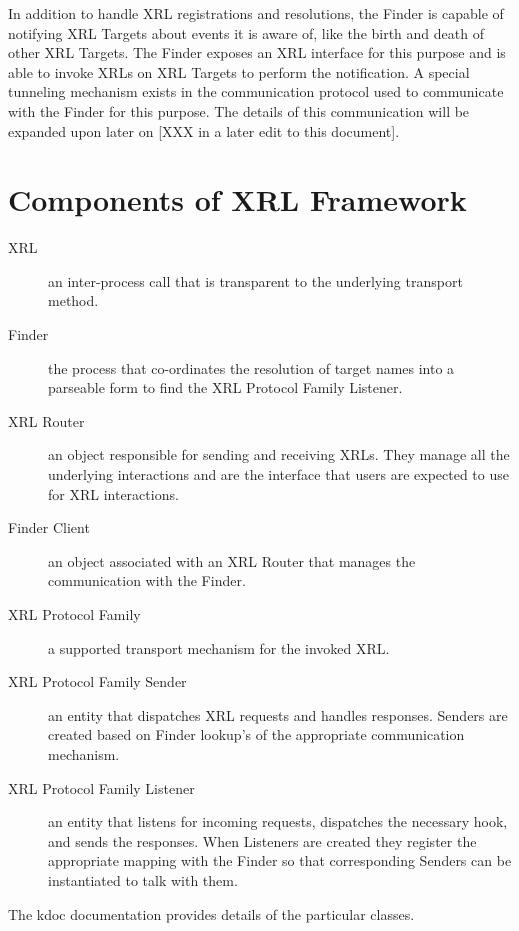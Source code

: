 \documentclass[11pt]{article}
\begin{document}
In addition to handle XRL registrations and resolutions, the Finder is
capable of notifying XRL Targets about events it is aware of, like the
birth and death of other XRL Targets.  The Finder exposes an XRL
interface for this purpose and is able to invoke XRLs on XRL Targets
to perform the notification.  A special tunneling mechanism exists in
the communication protocol used to communicate with the Finder for
this purpose.  The details of this communication will be expanded upon
later on [XXX in a later edit to this document].

\section{Components of XRL Framework}

\begin{description}
  \item [XRL] an inter-process call that is transparent to the
	underlying transport method.
  \item [Finder] the process that co-ordinates the resolution of target
	names into a parseable form to find the XRL Protocol Family Listener.
  \item [XRL Router] an object responsible for sending and receiving
	XRLs.  They manage all the underlying interactions and are the
	interface that users are expected to use for XRL interactions.
  \item [Finder Client] an object associated with an XRL Router that
	manages the communication with the Finder.
  \item [XRL Protocol Family] a supported transport mechanism for the
	invoked XRL.
  \item [XRL Protocol Family Sender] an entity that dispatches XRL
	requests and handles responses.  Senders are created based on Finder
	lookup's of the appropriate communication mechanism.
  \item [XRL Protocol Family Listener] an entity that listens for
	incoming requests, dispatches the necessary hook, and sends the
	responses.  When Listeners are created they register the appropriate
	mapping with the Finder so that corresponding Senders can be
	instantiated to talk with them.
\end{description}

The kdoc documentation provides details of the particular classes.
\end{document}

